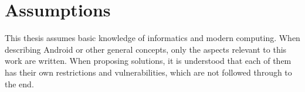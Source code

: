 \chapter{Assumptions}
This thesis assumes basic knowledge of informatics and modern computing.
When describing Android or other general concepts, only the aspects relevant to this work are written.
When proposing solutions, it is understood that each of them has their own restrictions and vulnerabilities, which are not followed through to the end.
